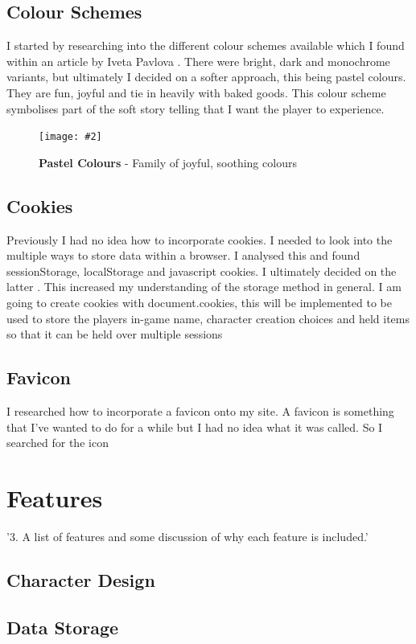 \documentclass[10pt, a4paper]{article}
\newcommand{\figuremacro}[5]{
    \begin{figure}[#1]
        \centering
        \texttt{[image: \#2]}
        \caption[#3]{\textbf{#3}#4}
        \label{fig:#2}
    \end{figure}
}
\begin{document}
	\subsection{Colour Schemes}
	I started by researching into the different colour schemes available which I found within an article by Iveta Pavlova \cite{ColourSchemes}. There were bright, dark and monochrome variants, but ultimately I decided on a softer approach, this being pastel colours. They are fun, joyful and tie in heavily with baked goods. This colour scheme symbolises part of the soft story telling that I want the player to experience. \\
	\figuremacro{h}{pastel}{Pastel Colours}{ - Family of joyful, soothing colours \cite{PastelColours}}{1.0}
  
	\subsection{Cookies}
	Previously I had no idea how to incorporate cookies. I needed to look into the multiple ways to store data within a browser. I analysed this and found sessionStorage, localStorage and javascript cookies. I ultimately decided on the latter \cite{JavascriptCookies}. This increased my understanding of the storage method in general. I am going to create cookies with document.cookies, this will be implemented to be used to store the players in-game name, character creation choices and held items so that it can be held over multiple sessions 
	
	\subsection{Favicon}
	I researched how to incorporate a favicon onto my site.  
	A favicon is something that I've wanted to do for a while but I had no idea what it was called. So I searched for the icon 
	
    \section{Features}
    '3. A list of features and some discussion of why each feature is included.' 
    
    \subsection{Character Design}
    \subsection{Data Storage}
\end{document}
